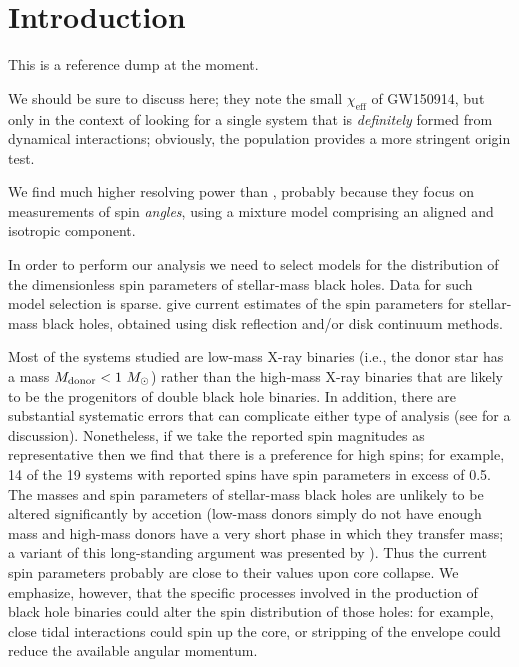 \documentclass[modern]{aastex61}
\newcommand{\chieff}{\chi_\mathrm{eff}}
\begin{document}
\acresetall{}

\section{Introduction}

This is a reference dump at the moment.  

We should be sure to discuss \citet{Rodriguez2016} here; they note the
small $\chieff$ of GW150914, but only in the context of looking for a
single system that is \emph{definitely} formed from dynamical
interactions; obviously, the population provides a more stringent
origin test.

We find much higher resolving power than \citet{Vitale2015}, probably
because they focus on measurements of spin \emph{angles}, using a
mixture model comprising an aligned and isotropic component.

In order to perform our analysis we need to select models for the 
distribution of the dimensionless spin parameters of stellar-mass black 
holes.  Data for such model selection is sparse.  \citet{2015PhR...548....1M} 
give current estimates of the spin parameters for stellar-mass black holes, 
obtained using disk reflection and/or disk continuum methods.  

Most of the systems studied are low-mass X-ray binaries (i.e., the donor star 
has a mass $M_{\rm donor}<1~M_\odot$) rather than the high-mass X-ray binaries 
that are likely to be the progenitors of double black hole binaries.  In 
addition, there are substantial systematic errors that can complicate either 
type of analysis (see \citealt{2015PhR...548....1M} for a discussion). Nonetheless, 
if we take the reported spin magnitudes as representative then we find that there 
is a preference for high spins; for example, 14 of the 19 systems with reported 
spins have spin parameters in excess of 0.5.  The masses and spin parameters of 
stellar-mass black holes are unlikely to be altered significantly by accetion 
(low-mass donors simply do not have enough mass and high-mass donors have a very 
short phase in which they transfer mass; a variant of this long-standing argument 
was presented by \citealt{1999MNRAS.305..654K}).  Thus the current spin parameters 
probably are close to their values upon core collapse.  We emphasize, however, 
that the specific processes involved in the production of black hole binaries 
could alter the spin distribution of those holes: for example, close tidal 
interactions could spin up the core, or stripping of the envelope could reduce the 
available angular momentum.
\end{document}
